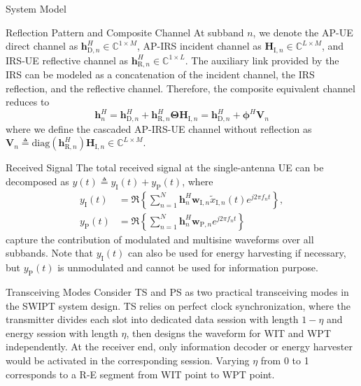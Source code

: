 \documentclass[journal]{IEEEtran}
\begin{document}
\begin{section}{System Model}
\begin{subsection}{Reflection Pattern and Composite Channel}
			At subband $n$, we denote the AP-UE direct channel as $\boldsymbol{h}_{\mathrm{D},n}^H \in \mathbb{C}^{1 \times M}$, AP-IRS incident channel as $\boldsymbol{H}_{\mathrm{I},n} \in \mathbb{C}^{L \times M}$, and IRS-UE reflective channel as $\boldsymbol{h}_{\mathrm{R},n}^H \in \mathbb{C}^{1 \times L}$. The auxiliary link provided by the IRS can be modeled as a concatenation of the incident channel, the IRS reflection, and the reflective channel. Therefore, the composite equivalent channel reduces to
			\begin{equation}\label{eq:h_n}
				\boldsymbol{h}_{n}^H = \boldsymbol{h}_{\mathrm{D},n}^H + \boldsymbol{h}_{\mathrm{R},n}^H \boldsymbol{\Theta} \boldsymbol{H}_{\mathrm{I},n} = \boldsymbol{h}_{\mathrm{D},n}^H + \boldsymbol{\phi}^H \boldsymbol{V}_{n}
			\end{equation}
			where we define the cascaded AP-IRS-UE channel without reflection as $\boldsymbol{V}_{n} \triangleq \mathrm{diag}(\boldsymbol{h}_{\mathrm{R},n}^H)\boldsymbol{H}_{\mathrm{I},n} \in \mathbb{C}^{L \times M}$.
		\end{subsection}


		\begin{subsection}{Received Signal}
			The total received signal at the single-antenna UE can be decomposed as $y(t) \triangleq y_{\mathrm{I}}(t)+y_\mathrm{P}(t)$, where
			\begin{align}
				y_{\mathrm{I}}(t) & = \Re\left\{\sum_{n=1}^N{\boldsymbol{h}_{n}^H}{\boldsymbol{w}_{\mathrm{I},n}\tilde{x}_{\mathrm{I},n}(t)}{e^{j2{\pi}{f_n}{t}}}\right\},\label{eq:y_I}\\
				y_{\mathrm{P}}(t) & = \Re\left\{\sum_{n=1}^N{\boldsymbol{h}_{n}^H}\boldsymbol{w}_{\mathrm{P},n}{e^{j2{\pi}{f_n}{t}}}\right\}\label{eq:y_P}
			\end{align}
			capture the contribution of modulated and multisine waveforms over all subbands. Note that $y_{\mathrm{I}}(t)$ can also be used for energy harvesting if necessary, but $y_{\mathrm{P}}(t)$ is unmodulated and cannot be used for information purpose.
		\end{subsection}


		\begin{subsection}{Transceiving Modes}
			Consider TS and PS as two practical transceiving modes in the SWIPT system design. TS relies on perfect clock synchronization, where the transmitter divides each slot into dedicated data session with length $1 - \eta$ and energy session with length $\eta$, then designs the waveform for WIT and WPT independently. At the receiver end, only information decoder or energy harvester would be activated in the corresponding session. Varying $\eta$ from \num{0} to \num{1} corresponds to a R-E segment from WIT point to WPT point.


\end{subsection}
\end{section}
\end{document}
